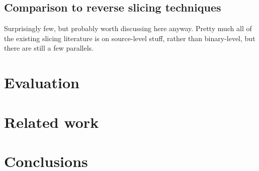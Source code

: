 \documentclass[12pt,a4paper]{book}
\begin{document}

\section{Comparison to reverse slicing techniques}
Surprisingly few, but probably worth discussing here anyway.
Pretty much all of the existing slicing literature is on source-level stuff, rather than binary-level, but there are still a few parallels.

\chapter{Evaluation}
\chapter{Related work}
\chapter{Conclusions}
\end{document}
